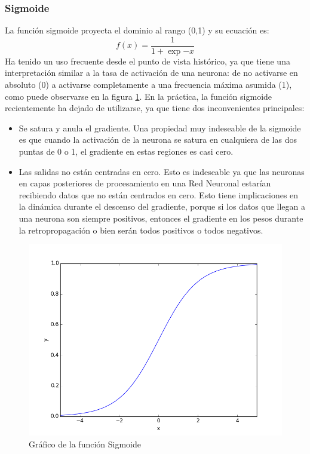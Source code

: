 \documentclass[a4paper,11pt,spanish]{book}
\begin{document}
	  \subsubsection {Sigmoide}

	    La función sigmoide proyecta el dominio al rango (0,1) y su ecuación es:
	    \begin{equation*}
	     f(x) = \frac{1}{1+\exp{-x}}
	    \end{equation*}
	    Ha tenido un uso frecuente desde el punto de vista histórico, ya que tiene una interpretación similar a la tasa de activación de una neurona:
	    de no activarse en absoluto (0) a activarse completamente a una frecuencia máxima asumida (1), como puede observarse en la figura \ref{fig:sigmoid}. En la práctica, la función sigmoide recientemente ha dejado de utilizarse,
	    ya  que tiene dos inconvenientes principales:
	    \begin{itemize}
	     \item Se satura y anula el gradiente. Una propiedad muy indeseable de la sigmoide es que cuando la activación de la neurona se satura en cualquiera de las dos puntas de 0 o 1,
	      el gradiente en estas regiones es casi cero.
	     \item Las salidas no están centradas en cero. Esto es indeseable ya que las neuronas en capas posteriores de procesamiento en una Red Neuronal estarían recibiendo
	      datos que no están centrados en cero. Esto tiene implicaciones en la dinámica durante el descenso del gradiente, porque si los datos que llegan a una neurona
	      son siempre positivos, entonces el gradiente en los pesos durante la retropropagación o bien serán todos positivos o todos negativos.
	    \end{itemize}
	    \begin{figure}[H]
	      \begin{center}
	       \includegraphics[width=0.4\linewidth]{./img/sigmoid.png}
	      \end{center}
	      \caption{Gráfico de la función Sigmoide}
	      \label{fig:sigmoid}
	    \end{figure}
\end{document}
